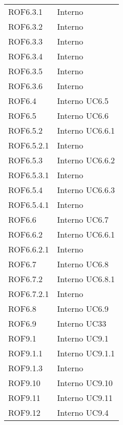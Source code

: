 \begin{longtable}{p{2.5cm}!{\VRule[1pt]}p{2.5cm}}
	\\
	ROF6.3.1 & Interno \\
	ROF6.3.2 & Interno \\
	ROF6.3.3 & Interno \\
	ROF6.3.4 & Interno \\
	ROF6.3.5 & Interno \\
	ROF6.3.6 & Interno \\
	ROF6.4 & Interno \newline UC6.5
	\\
	ROF6.5 & Interno \newline UC6.6
	\\
	ROF6.5.2 & Interno \newline UC6.6.1
	\\
	ROF6.5.2.1 & Interno \\
	ROF6.5.3 & Interno \newline UC6.6.2
	\\
	ROF6.5.3.1 & Interno \\
	ROF6.5.4 & Interno \newline UC6.6.3
	\\
	ROF6.5.4.1 & Interno \\
	ROF6.6 & Interno \newline UC6.7
	\\
	ROF6.6.2 & Interno \newline UC6.6.1
	\\
	ROF6.6.2.1 & Interno \\
	ROF6.7 & Interno \newline UC6.8
	\\
	ROF6.7.2 & Interno \newline UC6.8.1
	\\
	ROF6.7.2.1 & Interno \\
	ROF6.8 & Interno \newline UC6.9
	\\
	ROF6.9 & Interno \newline UC33
	\\
	ROF9.1 & Interno \newline UC9.1
	\\
	ROF9.1.1 & Interno \newline UC9.1.1
	\\
	ROF9.1.3 & Interno \\
	ROF9.10 & Interno \newline UC9.10
	\\
	ROF9.11 & Interno \newline UC9.11
	\\
	ROF9.12 & Interno \newline UC9.4

\end{longtable}

